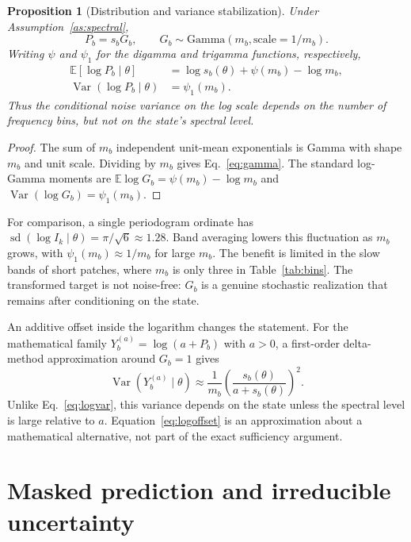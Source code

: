 \documentclass[11pt,a4paper]{article}
\newtheorem{proposition}{Proposition}
\newcommand{\E}{\mathbb{E}}
\newcommand{\Var}{\operatorname{Var}}
\begin{document}
\begin{proposition}[Distribution and variance stabilization]\label{prop:log}
Under Assumption~\ref{as:spectral},
\begin{equation}
P_b=s_bG_b,\qquad G_b\sim\mathrm{Gamma}(m_b,\text{scale}=1/m_b).
\label{eq:gamma}
\end{equation}
Writing $\psi$ and $\psi_1$ for the digamma and trigamma functions, respectively,
\begin{align}
\E[\log P_b\mid\theta]
&=\log s_b(\theta)+\psi(m_b)-\log m_b,\label{eq:logmean}\\
\Var(\log P_b\mid\theta)
&=\psi_1(m_b).\label{eq:logvar}
\end{align}
Thus the conditional noise variance on the log scale depends on the number of
frequency bins, but not on the state's spectral level.
\end{proposition}
\begin{proof}
The sum of $m_b$ independent unit-mean exponentials is Gamma with shape $m_b$
and unit scale. Dividing by $m_b$ gives Eq.~\eqref{eq:gamma}. The standard log-Gamma
moments are $\E\log G_b=\psi(m_b)-\log m_b$ and
$\Var(\log G_b)=\psi_1(m_b)$.
\end{proof}

For comparison, a single periodogram ordinate has
$\operatorname{sd}(\log I_k\mid\theta)=\pi/\sqrt{6}\approx1.28$.
Band averaging lowers this fluctuation as $m_b$ grows, with
$\psi_1(m_b)\approx1/m_b$ for large $m_b$. The benefit is limited in the
slow bands of short patches, where $m_b$ is only three in Table~\ref{tab:bins}.
The transformed target is not noise-free: $G_b$ is a genuine stochastic
realization that remains after conditioning on the state.

An additive offset inside the logarithm changes the statement. For the
mathematical family $Y_b^{(a)}=\log(a+P_b)$ with $a>0$, a first-order delta-method
approximation around $G_b=1$ gives
\begin{equation}
\Var(Y_b^{(a)}\mid\theta)
\approx\frac{1}{m_b}\left(\frac{s_b(\theta)}{a+s_b(\theta)}\right)^2.
\label{eq:logoffset}
\end{equation}
Unlike Eq.~\eqref{eq:logvar}, this variance depends on the state unless the
spectral level is large relative to $a$. Equation~\eqref{eq:logoffset} is an
approximation about a mathematical alternative, not part of the exact
sufficiency argument.

\section{Masked prediction and irreducible uncertainty}
\end{document}

